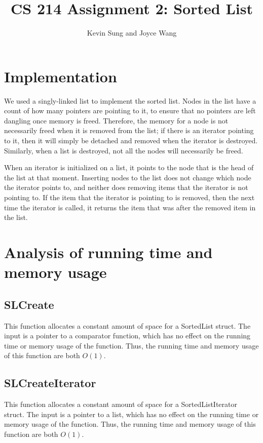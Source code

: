 \documentclass{article}
\title{CS 214 Assignment 2: Sorted List}
\author{Kevin Sung and Joyce Wang}
\begin{document}
\maketitle

\section{Implementation}

We used a singly-linked list to implement the sorted list. Nodes in the list have a count of how many pointers are
pointing to it, to ensure that no pointers are left dangling once memory is freed. Therefore, the memory for a node is
not necessarily freed when it is removed from the list; if there is an iterator pointing to it, then it will simply be
detached and removed when the iterator is destroyed. Similarly, when a list is destroyed, not all the nodes will
necessarily be freed.

When an iterator is initialized on a list, it points to the node that is the head of the list at that moment. Inserting
nodes to the list does not change which node the iterator points to, and neither does removing items that the iterator is
not pointing to. If the item that the iterator is pointing to is removed, then the next time the iterator is called, it
returns the item that was after the removed item in the list.

\section{Analysis of running time and memory usage}

\subsection{SLCreate}

This function allocates a constant amount of space for a SortedList struct. The input is a pointer to a comparator
function, which has no effect on the running time or memory usage of the function. Thus, the running time and memory
usage of this function are both $O(1)$.

\subsection{SLCreateIterator}

This function allocates a constant amount of space for a SortedListIterator struct. The input is a pointer to a list,
which has no effect on the running time or memory usage of the function. Thus, the running time and memory usage of this
function are both $O(1)$.
\end{document}
